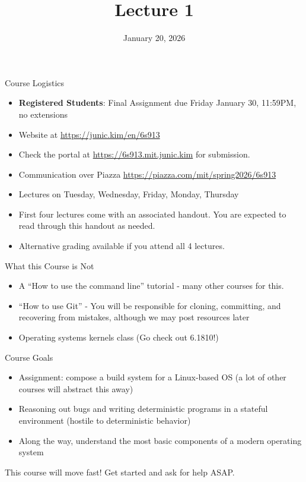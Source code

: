\documentclass{../lecture}
\title{Lecture 1}
\date{January 20, 2026}
\begin{document}
\maketitle

\begin{frame}{Course Logistics}
  \begin{itemize}
    \item \textbf{Registered Students}: Final Assignment due Friday January 30,
      11:59PM, no extensions
    \item Website at \url{https://junic.kim/en/6s913}
    \item Check the portal at \url{https://6s913.mit.junic.kim} for submission.
    \item Communication over Piazza \url{https://piazza.com/mit/spring2026/6s913}
    \item Lectures on Tuesday, Wednesday, Friday, Monday, Thursday
    \item First four lectures come with an associated handout. You are expected
      to read through this handout as needed.
    \item Alternative grading available if you attend all 4 lectures.
  \end{itemize}
\end{frame}

\begin{frame}{What this Course is Not}
  \begin{itemize}
    \item A ``How to use the command line'' tutorial - many other courses for
      this.
    \item ``How to use Git'' - You will be responsible for cloning, committing,
      and recovering from mistakes, although we may post resources later
    \item Operating systems kernels class (Go check out 6.1810!)
  \end{itemize}
\end{frame}

\begin{frame}{Course Goals}
  \begin{itemize}
    \item Assignment: compose a build system for a Linux-based OS (a lot of
      other courses will abstract this away)
    \item Reasoning out bugs and writing deterministic programs in a stateful
      environment (hostile to deterministic behavior)
    \item Along the way, understand the most basic components of a modern
      operating system
  \end{itemize}
  This course will move fast! Get started and ask for help ASAP.
\end{frame}
\end{document}
